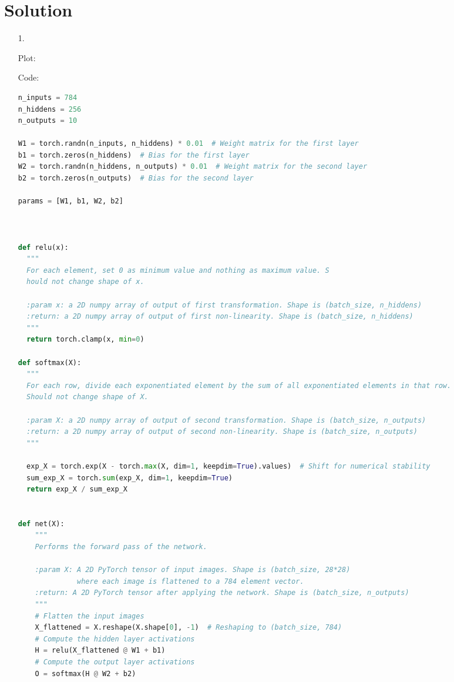 \documentclass[submit]{harvardml}
\newenvironment{answer}
  {\section*{Solution}}
{}
\begin{document}
\begin{answer}

  \begin{enumerate}
    \item[1.]

      Plot:


      Code:

      \begin{lstlisting}[language=Python]
n_inputs = 784
n_hiddens = 256
n_outputs = 10

W1 = torch.randn(n_inputs, n_hiddens) * 0.01  # Weight matrix for the first layer
b1 = torch.zeros(n_hiddens)  # Bias for the first layer
W2 = torch.randn(n_hiddens, n_outputs) * 0.01  # Weight matrix for the second layer
b2 = torch.zeros(n_outputs)  # Bias for the second layer

params = [W1, b1, W2, b2]



def relu(x):
  """
  For each element, set 0 as minimum value and nothing as maximum value. S
  hould not change shape of x.

  :param x: a 2D numpy array of output of first transformation. Shape is (batch_size, n_hiddens)
  :return: a 2D numpy array of output of first non-linearity. Shape is (batch_size, n_hiddens)
  """
  return torch.clamp(x, min=0)

def softmax(X):
  """
  For each row, divide each exponentiated element by the sum of all exponentiated elements in that row. 
  Should not change shape of X.

  :param X: a 2D numpy array of output of second transformation. Shape is (batch_size, n_outputs)
  :return: a 2D numpy array of output of second non-linearity. Shape is (batch_size, n_outputs)
  """

  exp_X = torch.exp(X - torch.max(X, dim=1, keepdim=True).values)  # Shift for numerical stability
  sum_exp_X = torch.sum(exp_X, dim=1, keepdim=True)
  return exp_X / sum_exp_X


def net(X):
    """
    Performs the forward pass of the network.

    :param X: A 2D PyTorch tensor of input images. Shape is (batch_size, 28*28)
              where each image is flattened to a 784 element vector.
    :return: A 2D PyTorch tensor after applying the network. Shape is (batch_size, n_outputs)
    """
    # Flatten the input images
    X_flattened = X.reshape(X.shape[0], -1)  # Reshaping to (batch_size, 784)
    # Compute the hidden layer activations
    H = relu(X_flattened @ W1 + b1)
    # Compute the output layer activations
    O = softmax(H @ W2 + b2)
    

\end{lstlisting}
\end{enumerate}
\end{answer}
\end{document}
